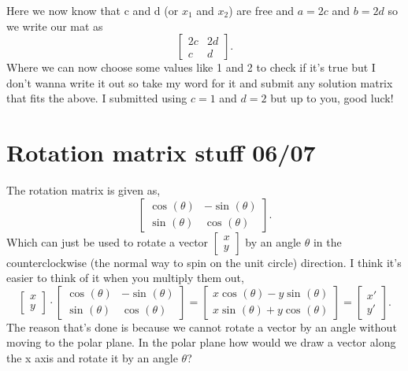 \documentclass{report}
\begin{document}
Here we now know that c and d (or $ x_1 $ and $ x_2 $) are free and $ a= 2c $ and $ b=2d $ so we write our mat as
\[
	\begin{bmatrix} 2c & 2d \\ c & d \end{bmatrix} 
.\] 
Where we can now choose some values like 1 and 2 to check if it's true but I don't wanna write it out so take my word for it and submit any solution matrix that fits the above. I submitted using $ c=1 $ and $ d=2 $ but up to you, good luck!
\newpage
\section{Rotation matrix stuff 06/07}%
\label{sec: Rotation matrix stuff 06/07 }
The rotation matrix is given as,
\[
	\begin{bmatrix} \cos^{  } \left( \theta \right) & -\sin^{  } \left( \theta \right) \\ \sin^{  } \left( \theta \right) & \cos^{  } \left( \theta \right)  \end{bmatrix} 
.\] 
Which can just be used to rotate a vector $ \begin{bmatrix} x \\ y \end{bmatrix} $ by an angle $ \theta $ in the counterclockwise (the normal way to spin on the unit circle) direction. I think it's easier to think of it when you multiply them out,
\[
	\begin{bmatrix} x \\ y \end{bmatrix} \cdot \begin{bmatrix} \cos^{  } \left( \theta \right) & -\sin^{  } \left( \theta \right) \\ \sin^{  } \left( \theta \right) & \cos^{  } \left( \theta \right)  \end{bmatrix} = \begin{bmatrix} x \cos^{  } \left( \theta \right) - y \sin^{  } \left( \theta \right) \\ x \sin^{  } \left( \theta \right) + y \cos^{  } \left( \theta \right)  \end{bmatrix} = \begin{bmatrix} x' \\ y' \end{bmatrix}
.\] 
The reason that's done is because we cannot rotate a vector by an angle without moving to the polar plane. In the polar plane how would we draw a vector along the x axis and rotate it by an angle $ \theta $? \\\\ 
\end{document}
